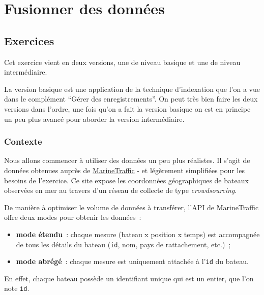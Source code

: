     
    
    
    

    

    \hypertarget{fusionner-des-donnuxe9es}{%
\section{Fusionner des données}\label{fusionner-des-donnuxe9es}}

    \hypertarget{exercices}{%
\subsection{Exercices}\label{exercices}}

    Cet exercice vient en deux versions, une de niveau basique et une de
niveau intermédiaire.

La version basique est une application de la technique d'indexation que
l'on a vue dans le complément ``Gérer des enregistrements''. On peut
très bien faire les deux versions dans l'ordre, une fois qu'on a fait la
version basique on est en principe un peu plus avancé pour aborder la
version intermédiaire.

    \hypertarget{contexte}{%
\subsubsection{Contexte}\label{contexte}}

    Nous allons commencer à utiliser des données un peu plus réalistes. Il
s'agit de données obtenues auprès de
\href{https://www.marinetraffic.com}{MarineTraffic} - et légèrement
simplifiées pour les besoins de l'exercice. Ce site expose les
coordonnées géographiques de bateaux observées en mer au travers d'un
réseau de collecte de type \emph{crowdsourcing}.

    De manière à optimiser le volume de données à transférer, l'API de
MarineTraffic offre deux modes pour obtenir les données~:

\begin{itemize}
\tightlist
\item
  \textbf{mode étendu}~: chaque mesure (bateau x position x temps) est
  accompagnée de tous les détails du bateau (\texttt{id}, nom, pays de
  rattachement, etc.)~;
\item
  \textbf{mode abrégé}~: chaque mesure est uniquement attachée à
  l'\texttt{id} du bateau.
\end{itemize}

En effet, chaque bateau possède un identifiant unique qui est un entier,
que l'on note \texttt{id}.

